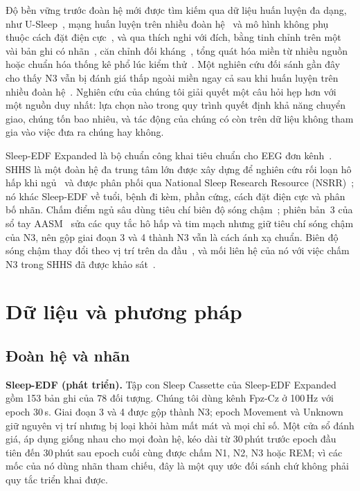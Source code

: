 \documentclass[11pt,a4paper]{article}
\begin{document}
Độ bền vững trước đoàn hệ mới được tìm kiếm qua dữ liệu huấn luyện đa dạng, như
U-Sleep~\cite{perslev2021usleep,fiorillo2023usleep}, mạng huấn luyện trên nhiều đoàn hệ~\cite{olesen2021mixed}
và mô hình không phụ thuộc cách đặt điện cực~\cite{guillot2021robustsleepnet}, và qua thích nghi với đích,
bằng tinh chỉnh trên một vài bản ghi có nhãn~\cite{phan2021transfer}, căn chỉnh đối
kháng~\cite{heremans2022adversarial,eldele2023adast}, tổng quát hóa miền từ nhiều nguồn~\cite{wang2024sleepdg}
hoặc chuẩn hóa thống kê phổ lúc kiểm thử~\cite{gnassounou2025psdnorm}. Một nghiên cứu đối sánh gần đây cho thấy
N3 vẫn bị đánh giá thấp ngoài miền ngay cả sau khi huấn luyện trên nhiều đoàn hệ~\cite{deirossi2025sleepyland}.
Nghiên cứu của chúng tôi giải quyết một câu hỏi hẹp hơn với một nguồn duy nhất: lựa chọn nào trong quy trình
quyết định khả năng chuyển giao, chúng tốn bao nhiêu, và tác động của chúng có còn trên dữ liệu không tham gia
vào việc đưa ra chúng hay không.

Sleep-EDF Expanded là bộ chuẩn công khai tiêu chuẩn cho EEG đơn
kênh~\cite{kemp2000sleepEDF,physionetSleepEDF,pollard2026physionet}. SHHS là một đoàn hệ đa trung tâm lớn được
xây dựng để nghiên cứu rối loạn hô hấp khi ngủ~\cite{quan1997shhs} và được phân phối qua National Sleep Research
Resource (NSRR)~\cite{zhang2018nsrr}; nó khác Sleep-EDF về tuổi, bệnh đi kèm, phần cứng, cách đặt điện cực và
phân bố nhãn. Chấm điểm ngủ sâu dùng tiêu chí biên độ sóng chậm~\cite{rechtschaffen1968,berry2017aasm}; phiên bản~3 của sổ tay
AASM~\cite{troester2023aasm} sửa các quy tắc hô hấp và tim mạch nhưng giữ tiêu chí sóng chậm của N3, nên gộp
giai đoạn 3 và 4 thành N3 vẫn là cách ánh xạ chuẩn. Biên độ sóng chậm thay đổi theo vị trí trên da đầu~\cite{massimini2004travelling}, và mối liên hệ của nó với việc chấm
N3 trong SHHS đã được khảo sát~\cite{davidson2025n3}.

\section{Dữ liệu và phương pháp}

\subsection{Đoàn hệ và nhãn}

\textbf{Sleep-EDF (phát triển).} Tập con Sleep Cassette của Sleep-EDF Expanded gồm 153 bản ghi của 78 đối
tượng. Chúng tôi dùng kênh Fpz-Cz ở 100\,Hz với epoch 30\,s. Giai đoạn 3 và 4 được gộp thành N3; epoch Movement
và Unknown giữ nguyên vị trí nhưng bị loại khỏi hàm mất mát và mọi chỉ số. Một cửa sổ đánh giá, áp dụng giống
nhau cho mọi đoàn hệ, kéo dài từ 30\,phút trước epoch đầu tiên đến 30\,phút sau epoch cuối cùng được chấm N1,
N2, N3 hoặc REM; vì các mốc của nó dùng nhãn tham chiếu, đây là một quy ước đối sánh chứ không phải quy tắc
triển khai được.
\end{document}
